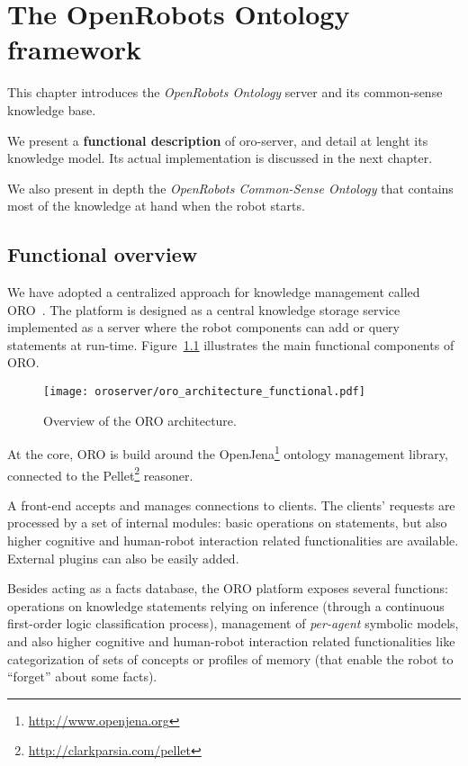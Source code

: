 \chapter{The OpenRobots Ontology framework}
\label{chapter|oroserver}

This chapter introduces the \emph{OpenRobots Ontology} server and its
common-sense knowledge base.

We present a \textbf{functional description} of oro-server, and detail at
lenght its knowledge model. Its actual implementation is discussed in the next
chapter.

We also present in depth the \emph{OpenRobots Common-Sense Ontology} that
contains most of the knowledge at hand when the robot starts.

\section{Functional overview}
\label{sect|functional-overview}


We have adopted a centralized approach for knowledge management called
ORO~\cite{Lemaignan2010}. The platform is designed as a central
knowledge storage service implemented as a server where the robot
components can add or query statements at run-time. Figure~\ref{fig|oro-overview}
illustrates the main functional components of ORO.

\begin{figure}
\centering
  \texttt{[image: oroserver/oro\_architecture\_functional.pdf]}
  \caption{Overview of the ORO architecture.}
  \label{fig|oro-overview}
\end{figure}

At the core, ORO is build around the
OpenJena\footnote{\url{http://www.openjena.org}} ontology management library,
connected to the Pellet\footnote{\url{http://clarkparsia.com/pellet}}
reasoner.

A front-end accepts and manages connections to clients. The clients' requests
are processed by a set of internal modules: basic operations on statements,
but also higher cognitive and human-robot interaction related functionalities
are available. External plugins can also be easily added.

Besides acting as a facts database, the ORO platform exposes several
functions: operations on knowledge statements relying on inference (through a
continuous first-order logic classification process), management of
\emph{per-agent} symbolic models, and also higher cognitive and human-robot
interaction related functionalities like categorization of sets of concepts
or profiles of memory (that enable the robot to ``forget'' about some facts).

